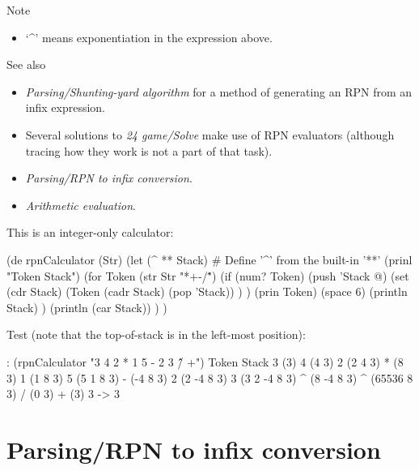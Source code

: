 \begin{description}
\item[Note]
\end{description}

\begin{itemize}
\item
  `\^{}' means exponentiation in the expression above.
\end{itemize}

\begin{description}
\item[See also]
\end{description}

\begin{itemize}
\item \emph{Parsing/Shunting-yard algorithm} for a method of
  generating an RPN from an infix expression.
\item
  Several solutions to \emph{24 game/Solve} make
  use of RPN evaluators (although tracing how they work is not a part of
  that task).
\item \emph{Parsing/RPN to infix conversion}.
\item
  \emph{Arithmetic evaluation}.
\end{itemize}


\begin{wideverbatim}

This is an integer-only calculator:

(de rpnCalculator (Str)
   (let (^ **  Stack)  # Define '^' from the built-in '**'
      (prinl "Token  Stack")
      (for Token (str Str "*+-/\^")
         (if (num? Token)
            (push 'Stack @)
            (set (cdr Stack)
               (Token (cadr Stack) (pop 'Stack)) ) )
         (prin Token)
         (space 6)
         (println Stack) )
      (println (car Stack)) ) )

Test (note that the top-of-stack is in the left-most position):

: (rpnCalculator "3 4 2 * 1 5 - 2 3 \^ \^ / +")
Token  Stack
3      (3)
4      (4 3)
2      (2 4 3)
*      (8 3)
1      (1 8 3)
5      (5 1 8 3)
-      (-4 8 3)
2      (2 -4 8 3)
3      (3 2 -4 8 3)
^      (8 -4 8 3)
^      (65536 8 3)
/      (0 3)
+      (3)
3
-> 3

\end{wideverbatim}

\pagebreak{}
\section*{Parsing/RPN to infix conversion}

